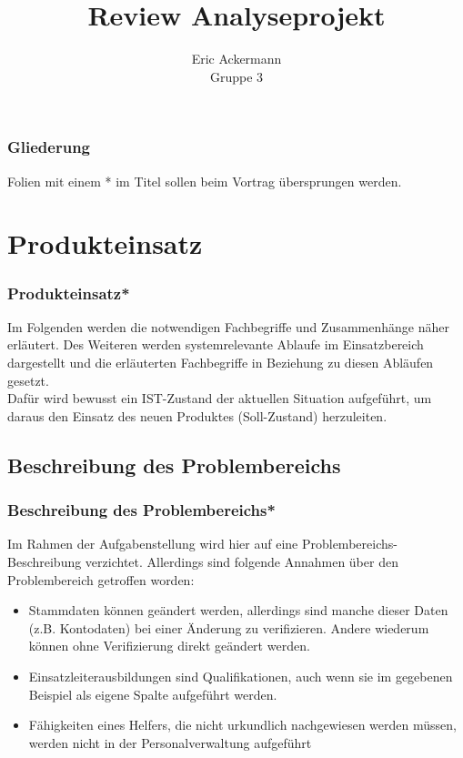 \documentclass{beamer}
\begin{document}
			
	
	\title[Review Analyseprojekt]{Review Analyseprojekt}
	\author[Eric Ackermann]{Eric Ackermann\\ Gruppe 3}
	
	 \begin{frame}[title=Hauptgebaeude_Nacht.jpg]
	 \maketitle
 	\end{frame}
	 
	\begin{frame}
		\frametitle{Gliederung}
		\tableofcontents
		Folien mit einem * im Titel sollen beim Vortrag übersprungen werden.
	\end{frame}

\section{Produkteinsatz}		
\begin{frame}
\frametitle{Produkteinsatz*}
Im Folgenden werden die notwendigen Fachbegriffe und Zusammenhänge näher erläutert. Des Weiteren werden systemrelevante Ablaufe im Einsatzbereich dargestellt und die erläuterten Fachbegriffe in Beziehung zu diesen Abläufen gesetzt.\\
Dafür wird bewusst ein IST-Zustand der aktuellen Situation aufgeführt, um daraus den Einsatz des neuen Produktes (Soll-Zustand) herzuleiten.
\end{frame}

\subsection{Beschreibung des Problembereichs}		
\begin{frame}
\frametitle{Beschreibung des Problembereichs*}
Im Rahmen der Aufgabenstellung wird hier auf eine Problembereichs-Beschreibung verzichtet. Allerdings sind folgende Annahmen über den Problembereich getroffen worden:
\begin{itemize}
\item Stammdaten können geändert werden, allerdings sind manche dieser Daten (z.B. Kontodaten) bei einer Änderung zu verifizieren. Andere wiederum können ohne Verifizierung direkt geändert werden.
\item Einsatzleiterausbildungen sind Qualifikationen, auch wenn sie im gegebenen Beispiel als eigene Spalte aufgeführt werden.
\item Fähigkeiten eines Helfers, die nicht urkundlich nachgewiesen werden müssen, werden nicht in der Personalverwaltung aufgeführt
\end{itemize}
\end{frame}
\end{document}
